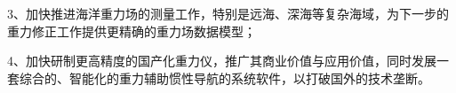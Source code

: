 \documentclass[12pt,a4,utf8]{article}
\begin{document}
3、加快推进海洋重力场的测量工作，特别是远海、深海等复杂海域，为下一步的重力修正工作提供更精确的重力场数据模型；

4、加快研制更高精度的国产化重力仪，推广其商业价值与应用价值，同时发展一套综合的、智能化的重力辅助惯性导航的系统软件，以打破国外的技术垄断。

\newpage


\end{document}
